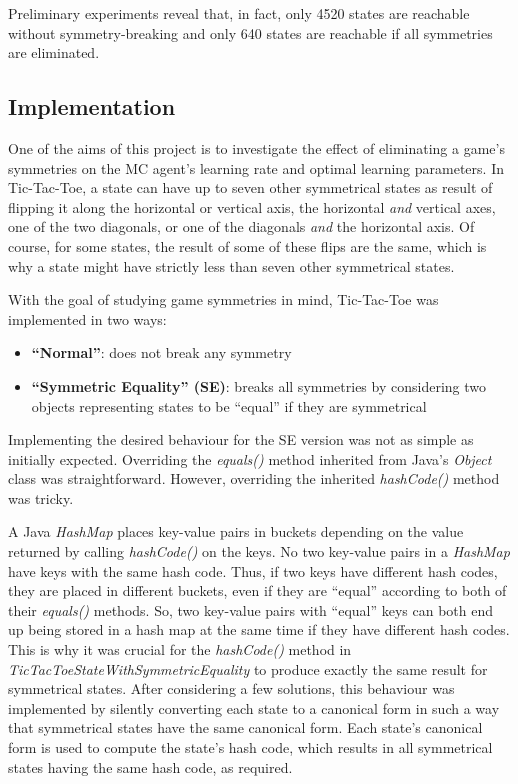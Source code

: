 \documentclass[11pt,a4paper]{report}
\begin{document}
Preliminary experiments reveal that, in fact, only 4520 states are reachable without symmetry-breaking and only 640 states are reachable if all symmetries are eliminated.


\subsection{Implementation}
\label{sec:TicTacToeImplementation}

One of the aims of this project is to investigate the effect of eliminating a game's symmetries on the MC agent's learning rate and optimal learning parameters. In Tic-Tac-Toe, a state can have up to seven other symmetrical states as result of flipping it along the horizontal or vertical axis, the horizontal \emph{and} vertical axes, one of the two diagonals, or one of the diagonals \emph{and} the horizontal axis. Of course, for some states, the result of some of these flips are the same, which is why a state might have strictly less than seven other symmetrical states.

With the goal of studying game symmetries in mind, Tic-Tac-Toe was implemented in two ways:

\begin{itemize}

	\item \textbf{``Normal''}:
does not break any symmetry

	\item \textbf{``Symmetric Equality'' (SE)}: 
breaks all symmetries by considering two objects representing states to be ``equal'' if they are symmetrical

\end{itemize}

Implementing the desired behaviour for the SE version was not as simple as initially expected. Overriding the \emph{equals()} method inherited from Java's \emph{Object} class was straightforward. However, overriding the inherited \emph{hashCode()} method was tricky.

A Java \emph{HashMap} places key-value pairs in buckets depending on the value returned by calling \emph{hashCode()} on the keys. No two key-value pairs in a \emph{HashMap} have keys with the same hash code. Thus, if two keys have different hash codes, they are placed in different buckets, even if they are ``equal'' according to both of their \emph{equals()} methods. So, two key-value pairs with ``equal'' keys can both end up being stored in a hash map at the same time if they have different hash codes. This is why it was crucial for the \emph{hashCode()} method in \emph{TicTacToeStateWithSymmetricEquality} to produce exactly the same result for symmetrical states. After considering a few solutions, this behaviour was implemented by silently converting each state to a canonical form in such a way that symmetrical states have the same canonical form. Each state's canonical form is used to compute the state's hash code, which results in all symmetrical states having the same hash code, as required.
\end{document}
